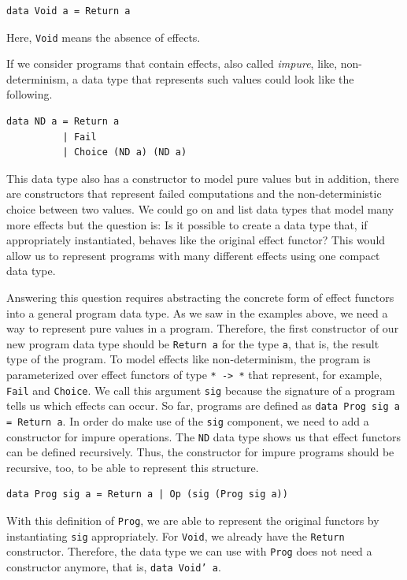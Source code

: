 \documentclass[a4paper, 11pt, fleqn, twoside]{scrreprt}
\newcommand{\hinl}[1]{\texttt{#1}}
\begin{document}
\begin{verbatim}
data Void a = Return a
\end{verbatim}

Here, \hinl{Void} means the absence of effects. 

If we consider programs that contain effects, also called \textit{impure}, 
like, non-determinism, a data type that represents such values could look like 
the following.

\begin{verbatim}
data ND a = Return a
          | Fail
          | Choice (ND a) (ND a)
\end{verbatim}

This data type also has a constructor to model pure values but in addition, 
there are constructors that represent failed computations and the 
non-deterministic choice between two values. We could go on and list data types 
that model many more effects but the question is: Is it possible to create a 
data type that, if appropriately instantiated, behaves like the original effect 
functor? This would allow us to represent programs with many different effects 
using one compact data type.

Answering this question requires abstracting the concrete form of effect 
functors into a general program data type. As we saw in the examples above, we 
need a way to represent pure values in a program. Therefore, the first 
constructor of our new program data type should be \hinl{Return 
a} for the type \hinl{a}, that is, the result type of the 
program. To model effects like non-determinism, the program is parameterized 
over effect functors of type \hinl{* -> *} that represent, for 
example, \hinl{Fail} and \hinl{Choice}. We call 
this argument \hinl{sig} because the signature of a program 
tells us which effects can occur. So far, programs are defined as 
\hinl{data Prog sig a = Return a}. In order do make use of the 
\hinl{sig} component, we need to add a constructor for impure 
operations. The \hinl{ND} data type shows us that effect 
functors can be defined recursively. Thus, the constructor for impure programs 
should be recursive, too, to be able to represent this structure.

\begin{verbatim}
data Prog sig a = Return a | Op (sig (Prog sig a))
\end{verbatim}

With this definition of \hinl{Prog}, we are able to represent 
the original functors by instantiating \hinl{sig} appropriately. 
For \hinl{Void}, we already have the 
\hinl{Return} constructor. Therefore, the data type we can use 
with \hinl{Prog} does not need a constructor anymore, that is, 
\hinl{data Void' a}. 
\end{document}
